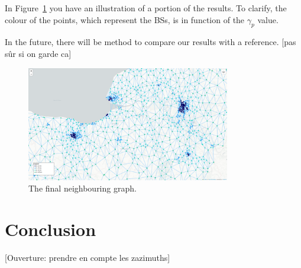 \documentclass[lettersize,journal,english]{IEEEtran}
\begin{document}
        In Figure~\ref{fig:final_neighs} you have an illustration of a portion of the results. To clarify, the colour of the points, which represent the BSs, is in function of the $\gamma_p$ value.

        In the future, there will be method to compare our results with a reference. [pas sûr si on garde ca]
        \begin{figure}
            \centering
            \includegraphics[width=3.5in]{images/illus_graphs/final_neighs_del_da.png}
            \caption{The final neighbouring graph.}
            \label{fig:final_neighs}
        \end{figure}

\section{Conclusion\label{sec:ccl}}
    [Ouverture: prendre en compte les zazimuths]



\end{document}
